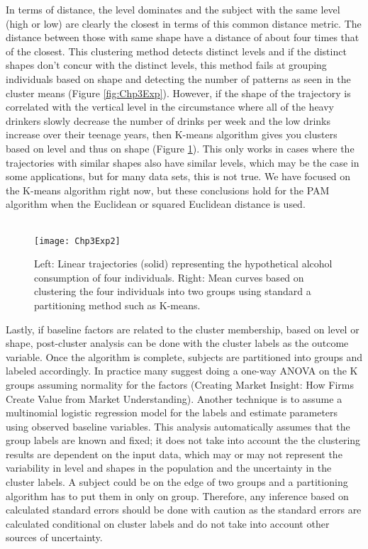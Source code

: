 \documentclass[12pt]{article}
\begin{document}
In terms of distance, the level dominates and the subject with the same level (high or low) are clearly the closest in terms of this common distance metric. The distance between those with same shape have a distance of about four times that of the closest. This clustering method detects distinct levels and if the distinct shapes don't concur with the distinct levels, this method fails at grouping individuals based on shape and detecting the number of patterns as seen in the cluster means (Figure \ref{fig:Chp3Exp}). However, if the shape of the trajectory is correlated with the vertical level in the circumstance where all of the heavy drinkers slowly decrease the number of drinks per week and the low drinks increase over their teenage years, then K-means algorithm gives you clusters based on level and thus on shape (Figure \ref{fig:Chp3Exp2}). This  only works in cases where the trajectories with similar shapes also have similar levels, which may be the case in some applications, but for many data sets, this is not true. We have focused on the K-means algorithm right now, but these conclusions hold for the PAM algorithm when the Euclidean or squared Euclidean distance is used.\\\\
\begin{figure}
\begin{center}
\texttt{[image: Chp3Exp2]}
\end{center}
\caption{Left: Linear trajectories (solid) representing the hypothetical alcohol consumption of four individuals. Right: Mean curves based on clustering the four individuals into two groups using standard a partitioning method such as K-means.}
\label{fig:Chp3Exp2} 
\end{figure}
Lastly, if baseline factors are related to the cluster membership, based on level or shape, post-cluster analysis can be done with the cluster labels as the outcome variable. Once the algorithm is complete, subjects are partitioned into groups and labeled accordingly. In practice many suggest doing a one-way ANOVA on the K groups assuming normality for the factors (Creating Market Insight: How Firms Create Value from Market Understanding). Another technique is to assume a multinomial logistic regression model for the labels and estimate parameters using observed baseline variables. This analysis automatically assumes that the group labels are known and fixed; it does not take into account the the clustering results are dependent on the input data, which may or may not represent the variability in level and shapes in the population and the uncertainty in the cluster labels. A subject could be on the edge of two groups and a partitioning algorithm has to put them in only on group. Therefore, any inference based on calculated standard errors should be done with caution as the standard errors are calculated conditional on cluster labels and do not take into account other sources of uncertainty.
\end{document}
